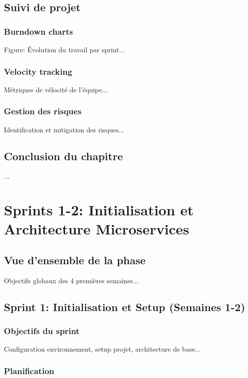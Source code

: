 \documentclass[12pt,a4paper]{report}
\begin{document}
\section{Suivi de projet}
\subsection{Burndown charts}
Figure: Évolution du travail par sprint...

\subsection{Velocity tracking}
Métriques de vélocité de l'équipe...

\subsection{Gestion des risques}
Identification et mitigation des risques...

\section{Conclusion du chapitre}
...

\chapter{Sprints 1-2: Initialisation et Architecture Microservices}
\label{chap:sprints1-2}

\section{Vue d'ensemble de la phase}
Objectifs globaux des 4 premières semaines...

\section{Sprint 1: Initialisation et Setup (Semaines 1-2)}
\subsection{Objectifs du sprint}
Configuration environnement, setup projet, architecture de base...

\subsection{Planification}
\end{document}
